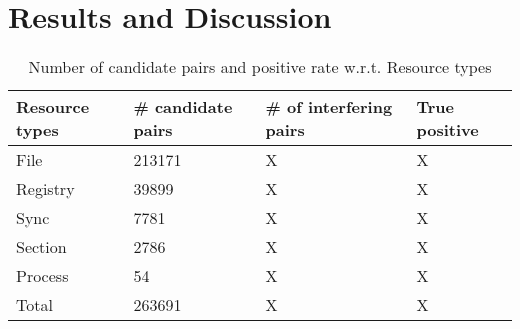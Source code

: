 \chapter{Results and Discussion}
\label{cha:Results and Discussion}
\begin{table}[htsb]
  \caption[Number of candidate pairs and positive rate w.r.t. Resource types]{Number of candidate pairs and positive rate w.r.t. Resource types}\label{tab:routers}
  \centering
  \begin{tabular}{l l l l}
    \toprule
    Resource types & \# candidate pairs& \# of interfering pairs & True positive \\
    \midrule
    File & 213171 & X & X \\
    Registry & 39899 & X & X \\
    Sync & 7781 & X & X \\
    Section & 2786 & X & X \\
    Process & 54 & X & X \\
    \bottomrule
    Total & 263691 & X & X \\
  \end{tabular}
\end{table}

